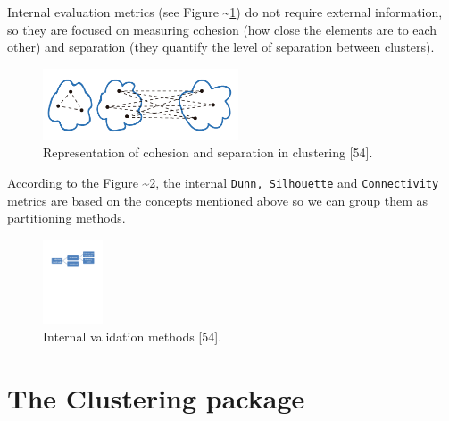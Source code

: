 \documentclass[
]{article}
\begin{document}
Internal evaluation metrics (see Figure \textasciitilde{}\ref{cohesion})
do not require external information, so they are focused on measuring
cohesion (how close the elements are to each other) and separation (they
quantify the level of separation between clusters).

\begin{figure}
\centering
\includegraphics[width=\textwidth,height=0.83333in]{img/cohesion.png}
\caption{Representation of cohesion and separation in clustering
{[}54{]}. \label{cohesion}}
\end{figure}

According to the Figure \textasciitilde{}\ref{internal}, the internal
\texttt{Dunn, Silhouette} and \texttt{Connectivity} metrics are based on
the concepts mentioned above so we can group them as partitioning
methods.

\begin{figure}
\centering
\includegraphics[width=\textwidth,height=0.98958in]{img/internal.pdf}
\caption{Internal validation methods {[}54{]}. \label{internal}}
\end{figure}

\hypertarget{the-clustering-package}{%
\section{\texorpdfstring{The \textbf{Clustering} package
\label{sec:seccion3}}{The Clustering package }}\label{the-clustering-package}}
\end{document}
